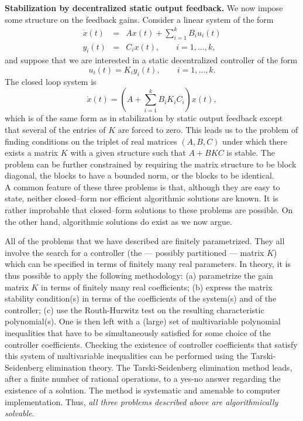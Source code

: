 {\bf Stabilization by decentralized static output feedback.} 
We now impose some structure on the feedback gains.
Consider a linear system of the form
\begin{eqnarray*}
{\dot x}(t) 	& = 	& A x(t) + \sum_{i=1}^kB_iu_i(t)\\
y_i(t)	& = 	& C_ix(t),\qquad i=1,\ldots,k,
\end{eqnarray*}
and suppose that we are interested in a static decentralized controller
of the form
$$u_i(t)=K_i y_i(t),\qquad i=1,\ldots,k.$$
The closed loop system is
$${\dot x}(t)=(A+\sum_{i=1}^kB_iK_iC_i) x(t),$$
which is of the same form as in stabilization by static output feedback
except that several of the entries of $K$ are forced to zero.
This leads us to the
problem of finding
conditions on the triplet of real matrices $(A, B, C)$ under which there
exists a matrix $K$ with a given structure such
that $A+BKC$ is stable. The problem can be further constrained by
requiring the matrix structure to be block diagonal, the blocks to
have a bounded norm, or the blocks to be identical.\\


A common feature of these three problems is that, although they are
easy to state, neither closed--form
nor efficient algorithmic solutions are known.
It is rather improbable that
closed--form solutions to these problems are possible.
On the other hand, algorithmic solutions do exist as we now argue.

All of the problems that we have described 
are finitely parametrized. They all involve the search
for a controller (the --- possibly partitioned
--- matrix $K$) which can be specified 
in terms of finitely many real parameters. In theory, 
it is thus possible to apply the following methodology: (a) parametrize the
gain matrix $K$ in terms of finitely many real coefficients; (b) express the 
matrix  stability condition(s) in terms of 
the coefficients of the system(s) and of the controller; (c) 
use the Routh-Hurwitz test
on the resulting characteristic polynomial(s). One 
is then left with a (large) set of multivariable polynomial inequalities that 
have to be simultaneously satisfied for some choice of the 
controller coefficients. Checking 
the existence of controller 
coefficients that satisfy this system of 
multivariable inequalities can be performed using the Tarski-Seidenberg 
elimination theory. 
The Tarski-Seidenberg elimination method leads, after a finite 
number of rational operations, to a
yes-no answer regarding the existence of a solution. The method is systematic and amenable to computer
implementation.
Thus, {\it all three problems described above are
algorithmically solvable}.\\


